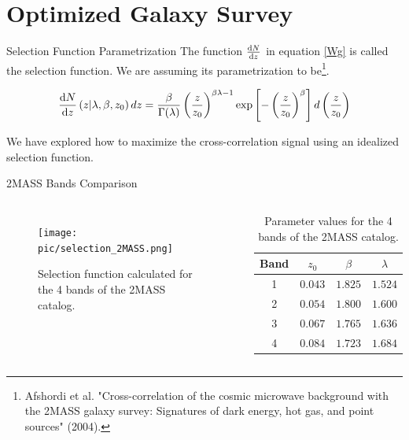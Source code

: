 \documentclass[serif, aspectratio=169]{beamer}
\begin{document}
\section{Optimized Galaxy Survey}

\begin{frame}{Selection Function Parametrization}
    The function $\dv{N}{z}$ in equation \eqref{Wg} is called the selection function. We are assuming its parametrization to be\footnote{Afshordi et al. "Cross-correlation of the cosmic microwave background with the 2MASS galaxy survey: Signatures of dark energy, hot gas, and point sources" (2004).}.

    \begin{equation}\label{select_func_par}
        \dv{N}{z}\left(z|\lambda, \beta, z_0\right)dz=\frac{\beta}{\Gamma(\lambda)}\left(\frac{z}{z_0}\right)^{\beta\lambda-1}\text{exp}\left[-\left(\frac{z}{z_0}\right)^\beta\right]d\left(\frac{z}{z_0}\right)
    \end{equation}

    We have explored how to maximize the cross-correlation signal using an idealized selection function.
\end{frame}

\begin{frame}{2MASS Bands Comparison}
    \begin{columns}
        \begin{figure}
            \centering
            \texttt{[image: pic/selection\_2MASS.png]}
            \caption{Selection function calculated for the 4 bands of the 2MASS catalog.}
            \label{fig:selection_2MASS}
        \end{figure}
    
        \begin{table}[!htb]
            \centering
            \begin{tabular}{cccc} \hline
             Band & $z_0$ & $\beta$ & $\lambda$ \\ \hline
             1 & $0.043$ & $1.825$ & $1.524$\\
             2 & $0.054$ & $1.800$ & $1.600$ \\
             3 & $0.067$ & $1.765$ & $1.636$\\
             4 & $0.084$ & $1.723$ & $1.684$\\ \hline
            \end{tabular}
            \caption{Parameter values for the 4 bands of the 2MASS catalog.}
            \label{tab:bands_2MASS}
        \end{table}
    \end{columns}
\end{frame}
\end{document}
